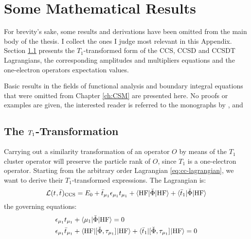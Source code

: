 \chapter{Some Mathematical Results}\label{app:mathematical-results}

For brevity's sake, some results and derivations have been omitted from the main
body of the thesis. I collect the ones I judge most relevant in this Appendix.
Section \ref{sec:T1-cc} presents the $T_1$-transformed form of the
\acrshort{CCS}, \acrshort{CCSD} and \acrshort{CCSDT} Lagrangians, the corresponding amplitudes
and multipliers equations and the one-electron operators expectation values.

Basic results in the fields of functional analysis and boundary integral
equations that were omitted from Chapter \ref{ch:CSM} are presented here.
No proofs or examples are given, the interested reader is referred to the
monographs by \citeauthor{Ern2004-oo},\autocite{Ern2004-oo} \citeauthor{Hsiao2008-xb}\autocite{Hsiao2008-xb} and
\citeauthor{Sauter2011-an}\autocite{Sauter2011-an}

\section{The \texorpdfstring{$\T1$}{T1}-Transformation}\label{sec:T1-cc}

Carrying out a similarity transformation of
an operator $O$ by means of the $T_1$ cluster operator will preserve the particle
rank of $O$, since $T_1$ is a one-electron operator.\autocite{Koch1994-vr}
Starting from the arbitrary order Lagrangian \eqref{eq:cc-lagrangian},
we want to derive their $T_1$-transformed
expressions.
The Lagrangian is:
\begin{equation}\label{eq:ccs-lagrangian}
 \mathcal{L}(t_{}, \bar{t}_{})_\mathrm{CCS}
 =
  E_0
  + \bar{t}_{\mu_1}\epsilon_{\mu_1}t_{\mu_1}
  + \braket{\mathrm{HF} | \check{\Phi} | \mathrm{HF}}
  + \braket{\bar{t}_{1} | \check{\Phi} | \mathrm{HF}}
\end{equation}
the governing equations:
\begin{subequations}\label{eq:ccs-equations}
  \begin{align}
   \epsilon_{\mu_1}t_{\mu_1} &+ \braket{\mu_1 | \check{\Phi} | \mathrm{HF}}
             = 0 \label{eq:ccs-amplitudes}\\
    \epsilon_{\mu_1}\bar{t}_{\mu_1} &+
    \braket{\mathrm{HF} | [ \check{\Phi}, \tau_{\mu_1} ]^{} | \mathrm{HF}} +
    \braket{\bar{t}_{1} |
    [ \check{\Phi}, \tau_{\mu_1} ]^{} | \mathrm{HF}}
             = 0 \label{eq:ccs-multipliers}
  \end{align}
\end{subequations}

